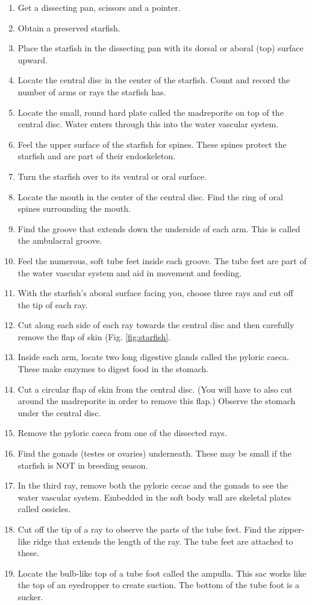 \documentclass[]{book}
\providecommand{\tightlist}{%
  \setlength{\itemsep}{0pt}\setlength{\parskip}{0pt}}
\theoremstyle{definition}
\theoremstyle{definition}
\theoremstyle{definition}
\theoremstyle{remark}
\begin{document}
\begin{enumerate}
\def\labelenumi{\arabic{enumi}.}
\tightlist
\item
  Get a dissecting pan, scissors and a pointer.
\item
  Obtain a preserved starfish.
\item
  Place the starfish in the dissecting pan with its dorsal or aboral
  (top) surface upward.
\item
  Locate the central disc in the center of the starfish. Count and
  record the number of arms or rays the starfish has.
\item
  Locate the small, round hard plate called the madreporite on top of
  the central disc. Water enters through this into the water vascular
  system.
\item
  Feel the upper surface of the starfish for spines. These spines
  protect the starfish and are part of their endoskeleton.
\item
  Turn the starfish over to its ventral or oral surface.
\item
  Locate the mouth in the center of the central disc. Find the ring of
  oral spines surrounding the mouth.
\item
  Find the groove that extends down the underside of each arm. This is
  called the ambulacral groove.
\item
  Feel the numerous, soft tube feet inside each groove. The tube feet
  are part of the water vascular system and aid in movement and feeding.
\item
  With the starfish's aboral surface facing you, choose three rays and
  cut off the tip of each ray.
\item
  Cut along each side of each ray towards the central disc and then
  carefully remove the flap of skin (Fig. \ref{fig:starfish}.
\item
  Inside each arm, locate two long digestive glands called the pyloric
  caeca. These make enzymes to digest food in the stomach.
\item
  Cut a circular flap of skin from the central disc. (You will have to
  also cut around the madreporite in order to remove this flap.) Observe
  the stomach under the central disc.
\item
  Remove the pyloric caeca from one of the dissected rays.
\item
  Find the gonads (testes or ovaries) underneath. These may be small if
  the starfish is NOT in breeding season.
\item
  In the third ray, remove both the pyloric cecae and the gonads to see
  the water vascular system. Embedded in the soft body wall are skeletal
  plates called ossicles.
\item
  Cut off the tip of a ray to observe the parts of the tube feet. Find
  the zipper-like ridge that extends the length of the ray. The tube
  feet are attached to these.
\item
  Locate the bulb-like top of a tube foot called the ampulla. This sac
  works like the top of an eyedropper to create suction. The bottom of
  the tube foot is a sucker.
\end{enumerate}
\end{document}
